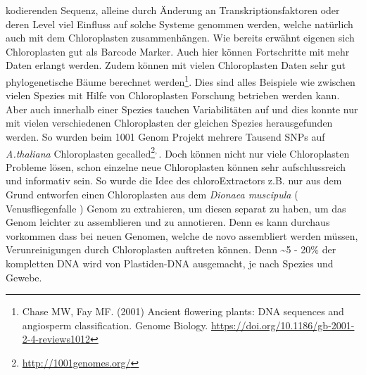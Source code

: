 \documentclass{scrartcl}
\begin{document}
kodierenden Sequenz, alleine durch Änderung an Transkriptionsfaktoren oder deren Level viel Einfluss auf solche Systeme genommen werden, welche natürlich auch mit dem Chloroplasten zusammenhängen\footnotemark[39]{}. Wie bereits erwähnt 
eigenen sich Chloroplasten gut als Barcode Marker. Auch hier können Fortschritte mit mehr Daten erlangt werden. Zudem können mit vielen Chloroplasten Daten sehr gut phylogenetische Bäume berechnet werden\footnote{Chase MW, Fay MF. (2001) Ancient flowering plants: DNA sequences and angiosperm classification. Genome Biology. \url{https://doi.org/10.1186/gb-2001-2-4-reviews1012}}.
Dies sind alles Beispiele wie zwischen vielen Spezies mit Hilfe von Chloroplasten Forschung betrieben werden kann. Aber auch innerhalb einer Spezies tauchen Variabilitäten auf und dies konnte nur mit vielen verschiedenen
Chloroplasten der gleichen Spezies herausgefunden werden. So wurden beim 1001 Genom Projekt mehrere Tausend SNPs auf \emph{A.thaliana} Chloroplasten gecalled\footnote{\url{http://1001genomes.org/}}\textsuperscript{,}\,\footnotemark[7]{}. 
Doch können nicht nur viele Chloroplasten Probleme lösen, schon einzelne neue Chloroplasten können sehr aufschlussreich und informativ sein. So wurde die Idee des chloroExtractors z.B. nur aus dem Grund
entworfen einen Chloroplasten aus dem \emph{Dionaea muscipula} ( Venusfliegenfalle ) Genom zu extrahieren, um diesen separat zu haben, um das Genom leichter zu assemblieren und zu annotieren. Denn es kann durchaus vorkommen
dass bei neuen Genomen, welche de novo assembliert werden müssen, Verunreinigungen durch Chloroplasten auftreten können. Denn \textasciitilde{}5 - 20\% der kompletten DNA wird von Plastiden-DNA ausgemacht, je nach Spezies und Gewebe\footnotemark[39]{}.
\end{document}
